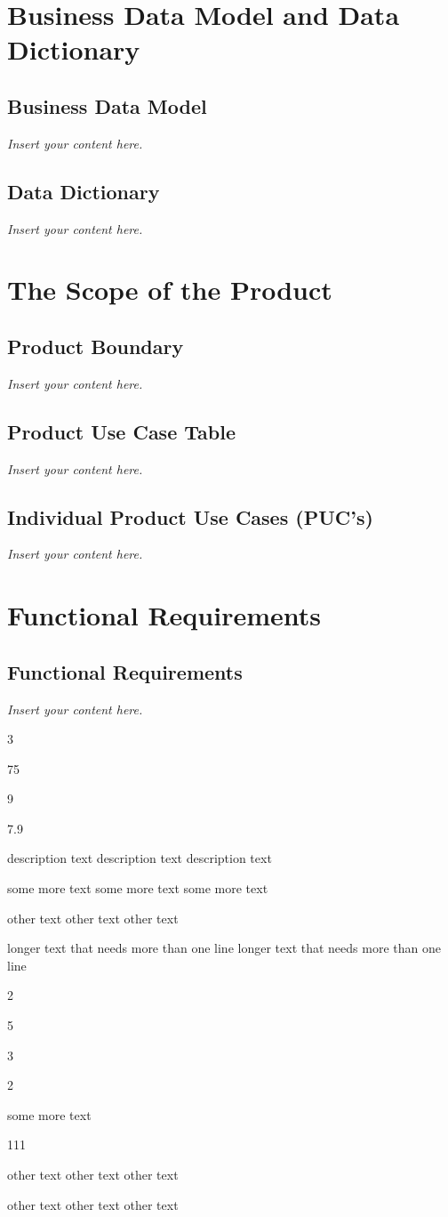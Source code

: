 \documentclass[12pt]{article}
\newenvironment{myreq}[1]{%
\setlist[description]{font=\normalfont\color{darkgray}}%
\begin{tcolorbox}[colframe=black,colback=white, sharp corners, boxrule=1pt]%
\bfseries\color{blue}%
\begin{description}#1}%
{\end{description}\end{tcolorbox}}
\newcommand{\threeinline}[3]{\begin{multicols}{3}#1 #2 #3\end{multicols}}
\newcommand{\twoinline}[2]{\begin{multicols}{2}#1 #2\end{multicols}}
\newcommand{\reqno}{\item[Requirement \#:]}
\newcommand{\reqtype}{\item[Requirement Type:]}
\newcommand{\reqevent}{\item[Event/BUC/PUC \#:]}
\newcommand{\reqdesc}{\item[Description:]}
\newcommand{\reqrat}{\item[Rationale:]}
\newcommand{\reqorig}{\item[Originator:]}
\newcommand{\reqfit}{\item[Fit Criterion:]}
\newcommand{\reqsatis}{\item[Customer Satisfaction:]}
\newcommand{\reqdissat}{\item[Customer Dissatisfaction:]}
\newcommand{\reqdep}{\item[Dependencies:]}
\newcommand{\reqconf}{\item[Conflicts:]}
\newcommand{\reqmater}{\item[Materials:]}
\newcommand{\reqhist}{\item[History:]}
\newcommand{\lips}{\textit{Insert your content here.}}
\begin{document}
\section{Business Data Model and Data Dictionary}
\subsection{Business Data Model}
\lips
\subsection{Data Dictionary}
\lips

\section{The Scope of the Product}
\subsection{Product Boundary}
\lips
\subsection{Product Use Case Table}
\lips
\subsection{Individual Product Use Cases (PUC's)}
\lips

\section{Functional Requirements}
\subsection{Functional Requirements}
\lips

\begin{myreq}
  \threeinline
    {\reqno 75}
    {\reqtype 9}
    {\reqevent 7.9}
  \reqdesc description text description text description text 
  \reqrat some more text some more text some more text 
  \reqorig other text other text other text 
  \reqfit longer text that needs more than one line longer text that needs more than one line
  \twoinline
    {\reqsatis 5}
    {\reqdissat 3}
  \twoinline
  {\reqdep some more text}
  {\reqconf 111}
  \reqmater other text other text other text 
  \reqhist other text other text other text 
\end{myreq}
\end{document}
